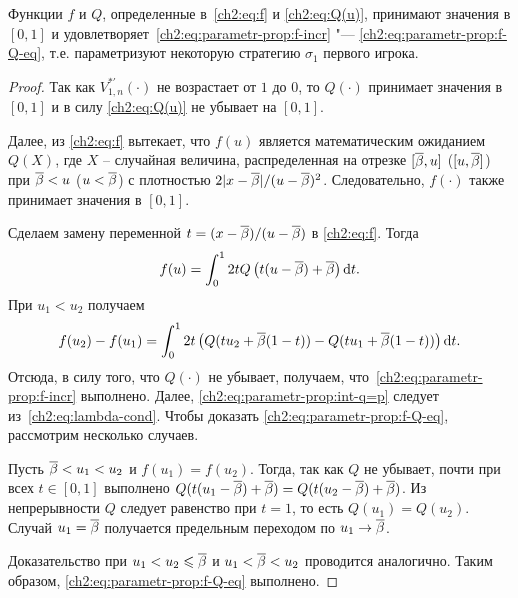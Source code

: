 {\begin{lemma}
  \label{ch2:lem:f-Q-is-strategy}
  Функции $f$ и $Q$\textnormal{,} определенные в~\eqref{ch2:eq:f} и \eqref{ch2:eq:Q(u)}\textnormal{,} принимают значения в $[0, 1]$ и удовлетворяет~\eqref{ch2:eq:parametr-prop:f-incr} "--- \eqref{ch2:eq:parametr-prop:f-Q-eq}\textnormal{,} т.е. параметризуют некоторую стратегию $\sigma_1$ первого игрока.
\end{lemma}
\begin{proof}
  Так как $V^{*\prime}_{1,n}(\cdot)$ не возрастает от $1$ до $0$, то $Q(\cdot)$ принимает значения в $[0, 1]$ и в силу \eqref{ch2:eq:Q(u)} не убывает на $[0, 1]$.

  Далее, из \eqref{ch2:eq:f} вытекает, что $f(u)$ является математическим ожиданием $Q(X)$, где $X$ -- случайная величина, распределенная на отрезке $[{\overline{\beta}}, u]$ ($[u, {\overline{\beta}}]$) при ${\overline{\beta}} < u$ ($u < {\overline{\beta}}$) с плотностью $2|x-{\overline{\beta}}|/(u-{\overline{\beta}})^2$.
  Следовательно, $f(\cdot)$ также принимает значения в $[0, 1]$.

  Сделаем замену переменной $t = (x - {\overline{\beta}})/(u - {\overline{\beta}})$ в \eqref{ch2:eq:f}. Тогда
  \begin{equation*}
    f(u) = \int_0^1 2 t Q \left( t(u - {\overline{\beta}}) + {\overline{\beta}} \right) \mathop{}\!\mathrm{d} t.
  \end{equation*}
  При $u_1 < u_2$ получаем
  \begin{equation*}
    f(u_2) - f(u_1) =
    \int_0^1 2t \left( 
      Q(t u_2 + {\overline{\beta}}(1-t)) - Q(t u_1 + {\overline{\beta}} (1-t))
    \right) \mathop{}\!\mathrm{d} t.
  \end{equation*}
  Отсюда, в силу того, что $Q(\cdot)$ не убывает, получаем, что~\eqref{ch2:eq:parametr-prop:f-incr} выполнено.
  Далее, \eqref{ch2:eq:parametr-prop:int-q=p} следует из~\ref{ch2:eq:lambda-cond}.
  Чтобы доказать \eqref{ch2:eq:parametr-prop:f-Q-eq}, рассмотрим несколько случаев.

  Пусть ${\overline{\beta}} < u_1 < u_2$ и $f(u_1) = f(u_2)$.
  Тогда, так как $Q$ не убывает, почти при всех $t \in [0, 1]$ выполнено $ Q(t(u_1 - {\overline{\beta}}) + {\overline{\beta}}) = Q(t(u_2 - {\overline{\beta}}) + {\overline{\beta}})$.
  Из непрерывности $Q$ следует равенство при $t = 1$, то есть $Q(u_1) = Q(u_2)$.
  Случай $u_1 = {\overline{\beta}}$ получается предельным переходом по $u_1 \rightarrow {\overline{\beta}}$.

  Доказательство при $u_1 < u_2 \leqslant {\overline{\beta}}$ и $u_1 < {\overline{\beta}} < u_2$ проводится аналогично.
  Таким образом, \eqref{ch2:eq:parametr-prop:f-Q-eq} выполнено.
\end{proof}

}
